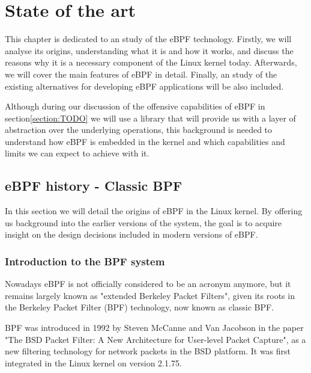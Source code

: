\documentclass[12pt]{report} %
\begin{document}
\chapter{State of the art}
This chapter is dedicated to an study of the eBPF technology. Firstly, we will analyse its origins, understanding what it is and how it works, and discuss the reasons why it is a necessary component of the Linux kernel today. Afterwards, we will cover the main features of eBPF in detail. Finally, an study of the existing alternatives for developing eBPF applications will be also included.

Although during our discussion of the offensive capabilities of eBPF in section\ref{section:TODO} we will use a library that will provide us with a layer of abstraction over the underlying operations, this background is needed to understand how eBPF is embedded in the kernel and which capabilities and limits we can expect to achieve with it.

\section{eBPF history - Classic BPF}
In this section we will detail the origins of eBPF in the Linux kernel. By offering us background into the earlier versions of the system, the goal is to acquire insight on the design decisions included in modern versions of eBPF.

\subsection{Introduction to the BPF system}
Nowadays eBPF is not officially considered to be an acronym anymore\cite{ebpf_io}, but it remains largely known as "extended Berkeley Packet Filters", given its roots in the Berkeley Packet Filter (BPF) technology, now known as classic BPF.

BPF was introduced in 1992 by Steven McCanne and Van Jacobson in the paper "The BSD Packet Filter: A New Architecture for User-level Packet Capture"\cite{bpf_bsd_origin}, as a new filtering technology for network packets in the BSD platform. It was first integrated in the Linux kernel on version 2.1.75\cite{ebpf_history_opensource}.
\end{document}
